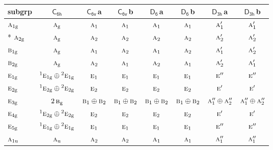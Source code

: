 \documentclass[10pt,a4paper]{article}
\numberwithin{equation}{section}
\newcommand{\grp}[1]{\mathsf{#1}}
\newcommand{\irr}[1]{\text{\normalfont\scshape #1}}
\newcommand{\conjpair}[1]{{}^{#1}}
\newcommand{\ptag}[1]{\mathrm{#1}}
\newcommand{\clsletter}[1]{\,{\scriptsize\color{black!55}#1}}
\begin{document}
{\small\begin{longtable}{@{}lccccccc@{}}\toprule
subgrp & \href{C6h.pdf}{$\grp{C_{6h}}$} & \href{C6v.pdf}{$\grp{C_{6v}}$}\clsletter{a} & \href{C6v.pdf}{$\grp{C_{6v}}$}\clsletter{b} & \href{D6.pdf}{$\grp{D_{6}}$}\clsletter{a} & \href{D6.pdf}{$\grp{D_{6}}$}\clsletter{b} & \href{D3h.pdf}{$\grp{D_{3h}}$}\clsletter{a} & \href{D3h.pdf}{$\grp{D_{3h}}$}\clsletter{b}\\\midrule\endhead
\bottomrule\endfoot\endlastfoot
$\irr{a}_{1\ptag{g}}$ & $\irr{a}_{\ptag{g}}$ & $\irr{a}_{1}$ & $\irr{a}_{1}$ & $\irr{a}_{1}$ & $\irr{a}_{1}$ & $\irr{a}_{1}'$ & $\irr{a}_{1}'$\\*
$\irr{a}_{2\ptag{g}}$ & $\irr{a}_{\ptag{g}}$ & $\irr{a}_{2}$ & $\irr{a}_{2}$ & $\irr{a}_{2}$ & $\irr{a}_{2}$ & $\irr{a}_{2}'$ & $\irr{a}_{2}'$\\
$\irr{b}_{1\ptag{g}}$ & $\irr{a}_{\ptag{g}}$ & $\irr{a}_{1}$ & $\irr{a}_{2}$ & $\irr{a}_{1}$ & $\irr{a}_{2}$ & $\irr{a}_{1}'$ & $\irr{a}_{2}'$\\
$\irr{b}_{2\ptag{g}}$ & $\irr{a}_{\ptag{g}}$ & $\irr{a}_{2}$ & $\irr{a}_{1}$ & $\irr{a}_{2}$ & $\irr{a}_{1}$ & $\irr{a}_{2}'$ & $\irr{a}_{1}'$\\
$\irr{e}_{1\ptag{g}}$ & $\conjpair{1}\irr{e}_{1\ptag{g}}\oplus \conjpair{2}\irr{e}_{1\ptag{g}}$ & $\irr{e}_{1}$ & $\irr{e}_{1}$ & $\irr{e}_{1}$ & $\irr{e}_{1}$ & $\irr{e}''$ & $\irr{e}''$\\
$\irr{e}_{2\ptag{g}}$ & $\conjpair{1}\irr{e}_{2\ptag{g}}\oplus \conjpair{2}\irr{e}_{2\ptag{g}}$ & $\irr{e}_{2}$ & $\irr{e}_{2}$ & $\irr{e}_{2}$ & $\irr{e}_{2}$ & $\irr{e}'$ & $\irr{e}'$\\
$\irr{e}_{3\ptag{g}}$ & $2\,\irr{b}_{\ptag{g}}$ & $\irr{b}_{1}\oplus \irr{b}_{2}$ & $\irr{b}_{1}\oplus \irr{b}_{2}$ & $\irr{b}_{1}\oplus \irr{b}_{2}$ & $\irr{b}_{1}\oplus \irr{b}_{2}$ & $\irr{a}_{1}''\oplus \irr{a}_{2}''$ & $\irr{a}_{1}''\oplus \irr{a}_{2}''$\\
$\irr{e}_{4\ptag{g}}$ & $\conjpair{1}\irr{e}_{2\ptag{g}}\oplus \conjpair{2}\irr{e}_{2\ptag{g}}$ & $\irr{e}_{2}$ & $\irr{e}_{2}$ & $\irr{e}_{2}$ & $\irr{e}_{2}$ & $\irr{e}'$ & $\irr{e}'$\\
$\irr{e}_{5\ptag{g}}$ & $\conjpair{1}\irr{e}_{1\ptag{g}}\oplus \conjpair{2}\irr{e}_{1\ptag{g}}$ & $\irr{e}_{1}$ & $\irr{e}_{1}$ & $\irr{e}_{1}$ & $\irr{e}_{1}$ & $\irr{e}''$ & $\irr{e}''$\\
$\irr{a}_{1\ptag{u}}$ & $\irr{a}_{\ptag{u}}$ & $\irr{a}_{2}$ & $\irr{a}_{2}$ & $\irr{a}_{1}$ & $\irr{a}_{1}$ & $\irr{a}_{1}''$ & $\irr{a}_{1}''$\\

\end{longtable}}
\end{document}
